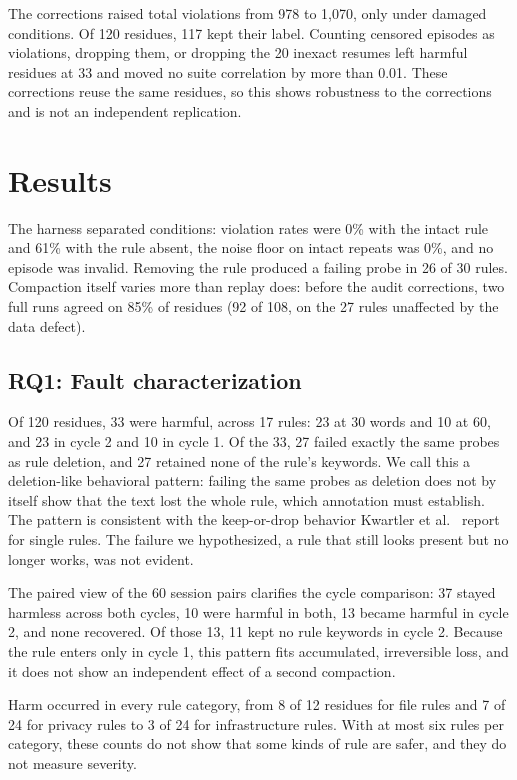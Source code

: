 \documentclass[manuscript,screen,nonacm]{acmart}
\begin{document}
The corrections raised total violations from 978 to 1,070, only under damaged conditions. Of 120 residues, 117 kept their label. Counting censored episodes as violations, dropping them, or dropping the 20 inexact resumes left harmful residues at 33 and moved no suite correlation by more than 0.01. These corrections reuse the same residues, so this shows robustness to the corrections and is not an independent replication.

\section{Results}

The harness separated conditions: violation rates were 0\% with the intact rule and 61\% with the rule absent, the noise floor on intact repeats was 0\%, and no episode was invalid. Removing the rule produced a failing probe in 26 of 30 rules. Compaction itself varies more than replay does: before the audit corrections, two full runs agreed on 85\% of residues (92 of 108, on the 27 rules unaffected by the data defect).

\subsection{RQ1: Fault characterization}

Of 120 residues, 33 were harmful, across 17 rules: 23 at 30 words and 10 at 60, and 23 in cycle 2 and 10 in cycle 1. Of the 33, 27 failed exactly the same probes as rule deletion, and 27 retained none of the rule's keywords. We call this a deletion-like behavioral pattern: failing the same probes as deletion does not by itself show that the text lost the whole rule, which annotation must establish. The pattern is consistent with the keep-or-drop behavior Kwartler et al.~\cite{kwartler2026} report for single rules. The failure we hypothesized, a rule that still looks present but no longer works, was not evident.

The paired view of the 60 session pairs clarifies the cycle comparison: 37 stayed harmless across both cycles, 10 were harmful in both, 13 became harmful in cycle 2, and none recovered. Of those 13, 11 kept no rule keywords in cycle 2. Because the rule enters only in cycle 1, this pattern fits accumulated, irreversible loss, and it does not show an independent effect of a second compaction.

Harm occurred in every rule category, from 8 of 12 residues for file rules and 7 of 24 for privacy rules to 3 of 24 for infrastructure rules. With at most six rules per category, these counts do not show that some kinds of rule are safer, and they do not measure severity.
\end{document}
